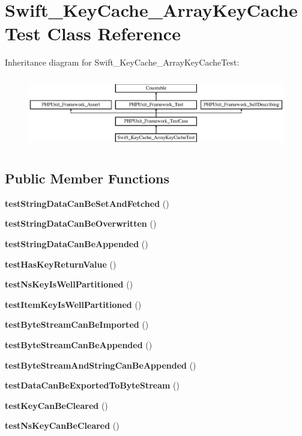 \section{Swift\+\_\+\+Key\+Cache\+\_\+\+Array\+Key\+Cache\+Test Class Reference}
\label{class_swift___key_cache___array_key_cache_test}
Inheritance diagram for Swift\+\_\+\+Key\+Cache\+\_\+\+Array\+Key\+Cache\+Test\+:\begin{figure}[H]
\begin{center}
\leavevmode
\includegraphics[height=3.177305cm]{class_swift___key_cache___array_key_cache_test}
\end{center}
\end{figure}
\subsection*{Public Member Functions}
\begin{DoxyCompactItemize}
\item 
{\bf test\+String\+Data\+Can\+Be\+Set\+And\+Fetched} ()
\item 
{\bf test\+String\+Data\+Can\+Be\+Overwritten} ()
\item 
{\bf test\+String\+Data\+Can\+Be\+Appended} ()
\item 
{\bf test\+Has\+Key\+Return\+Value} ()
\item 
{\bf test\+Ns\+Key\+Is\+Well\+Partitioned} ()
\item 
{\bf test\+Item\+Key\+Is\+Well\+Partitioned} ()
\item 
{\bf test\+Byte\+Stream\+Can\+Be\+Imported} ()
\item 
{\bf test\+Byte\+Stream\+Can\+Be\+Appended} ()
\item 
{\bf test\+Byte\+Stream\+And\+String\+Can\+Be\+Appended} ()
\item 
{\bf test\+Data\+Can\+Be\+Exported\+To\+Byte\+Stream} ()
\item 
{\bf test\+Key\+Can\+Be\+Cleared} ()
\item 
{\bf test\+Ns\+Key\+Can\+Be\+Cleared} ()
\end{DoxyCompactItemize}
